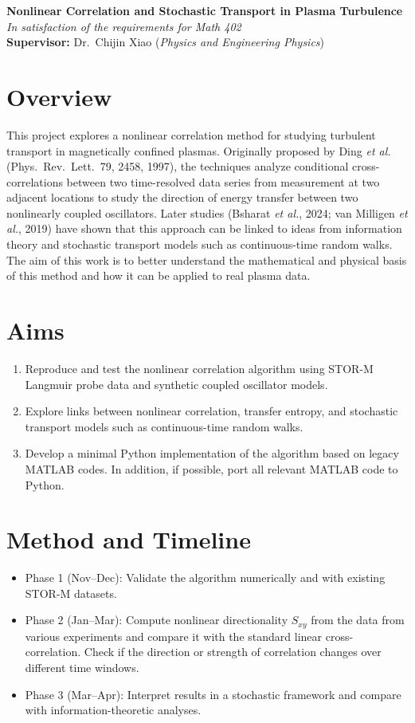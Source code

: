 \documentclass[12pt]{article}
\begin{document}
\begin{center}
    \Large \textbf{Nonlinear Correlation and Stochastic Transport in Plasma Turbulence} \\[4pt]
    \normalsize \emph{In satisfaction of the requirements for Math 402} \\
    \normalsize \textbf{Supervisor:} Dr.\ Chijin Xiao (\emph{Physics and Engineering Physics}) \hspace{1cm} 
\end{center}

\section*{Overview}
This project explores a nonlinear correlation method for studying turbulent transport in magnetically confined plasmas.
Originally proposed by Ding \textit{et al.} (Phys.\ Rev.\ Lett.\ 79, 2458, 1997), the techniques analyze conditional cross-correlations between two time-resolved data series from measurement at two adjacent locations to study the direction of energy transfer between two nonlinearly coupled oscillators. Later studies (Bsharat \textit{et al.}, 2024; van Milligen \textit{et al.}, 2019) have shown that this approach can be linked to ideas from information theory and stochastic transport models such as continuous-time random walks. The aim of this work is to better understand the mathematical and physical basis of this method and how it can be applied to real plasma data.
\section*{Aims}
\begin{enumerate}
    \item Reproduce and test the nonlinear correlation algorithm using STOR-M Langmuir probe data and synthetic coupled oscillator models.
    \item Explore links between nonlinear correlation, transfer entropy, and stochastic transport models such as continuous-time random walks. 
    \item Develop a minimal Python implementation of the algorithm based on legacy MATLAB codes. In addition, if possible, port all relevant MATLAB code to Python.
\end{enumerate}

\section*{Method and Timeline}
\begin{itemize}
	\item Phase 1 (Nov--Dec): Validate the algorithm numerically and with existing STOR-M datasets.  
	\item Phase 2 (Jan--Mar): Compute nonlinear directionality $S_{xy}$ from the data from various experiments and compare it with the standard linear cross-correlation. Check if the direction or strength of correlation changes over different time windows.	
	\item Phase 3 (Mar--Apr): Interpret results in a stochastic framework and compare with information-theoretic analyses.
\end{itemize}
\end{document}
